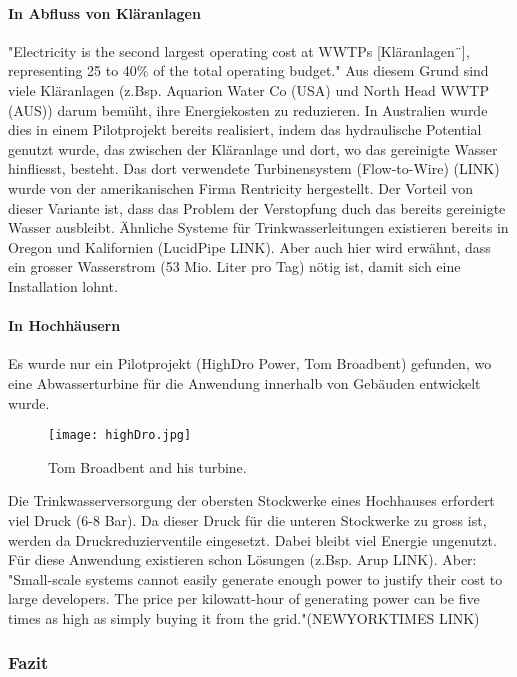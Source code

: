 \paragraph{In Abfluss von Kläranlagen}
"Electricity is the second largest operating cost at WWTPs [Kläranlagen¨], representing 25 to 40\% of the total operating budget."
Aus diesem Grund sind viele Kläranlagen (z.Bsp. Aquarion Water Co (USA) und North Head WWTP (AUS)) darum bemüht, ihre Energiekosten zu reduzieren. In Australien wurde dies in einem Pilotprojekt bereits realisiert, indem das hydraulische Potential genutzt wurde, das zwischen der Kläranlage und dort, wo das gereinigte Wasser hinfliesst, besteht. Das dort verwendete Turbinensystem (Flow-to-Wire) (LINK) wurde von der amerikanischen Firma Rentricity hergestellt. Der Vorteil von dieser Variante ist, dass das Problem der Verstopfung duch das bereits gereinigte Wasser ausbleibt.
Ähnliche Systeme für Trinkwasserleitungen existieren bereits in Oregon und Kalifornien (LucidPipe LINK). Aber auch hier wird erwähnt, dass ein grosser Wasserstrom (53 Mio. Liter pro Tag) nötig ist, damit sich eine Installation lohnt.
\paragraph{In Hochhäusern}
Es wurde nur ein Pilotprojekt (HighDro Power, Tom Broadbent) gefunden, wo eine Abwasserturbine für die Anwendung innerhalb von Gebäuden entwickelt wurde.
\begin{figure}
\centering
  \texttt{[image: highDro.jpg]}
  \caption{Tom Broadbent and his turbine.}
  \label{fig:turbineTomBroadBent}
\end{figure}
Die Trinkwasserversorgung der obersten Stockwerke eines Hochhauses erfordert viel Druck (6-8 Bar). Da dieser Druck für die unteren Stockwerke zu gross ist, werden da Druckreduzierventile eingesetzt. Dabei bleibt viel Energie ungenutzt. Für diese Anwendung existieren schon Lösungen (z.Bsp. Arup LINK). Aber:
"Small-scale systems cannot easily generate enough power to justify their cost to large developers. The price per kilowatt-hour of generating power can be five times as high as simply buying it from the grid."(NEWYORKTIMES LINK)
\subsubsection{Fazit}
\clearpage 
